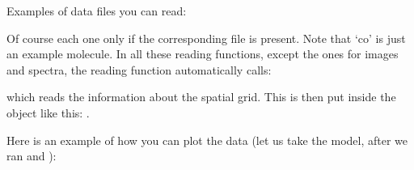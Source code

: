 \documentclass[letterpaper,10pt,english]{sphinxmanual}
\begin{document}
\begin{sphinxVerbatim}[commandchars=\\\{\}]
   
\end{sphinxVerbatim}

Examples of data files you can read:

\begin{sphinxVerbatim}[commandchars=\\\{\}]
  
  
  
  
  
  
  
  
  
  
  
\end{sphinxVerbatim}

Of course each one only if the corresponding file is present. Note that ‘co’ is
just an example molecule. In all these reading functions, except the ones for
images and spectra, the reading function automatically calls:

\begin{sphinxVerbatim}[commandchars=\\\{\}]
  
\end{sphinxVerbatim}

which reads the information about the spatial grid. This is then put inside the
 object like this: .

Here is an example of how you can plot the data (let us take the
 model, after we ran 
and ):
\end{document}
